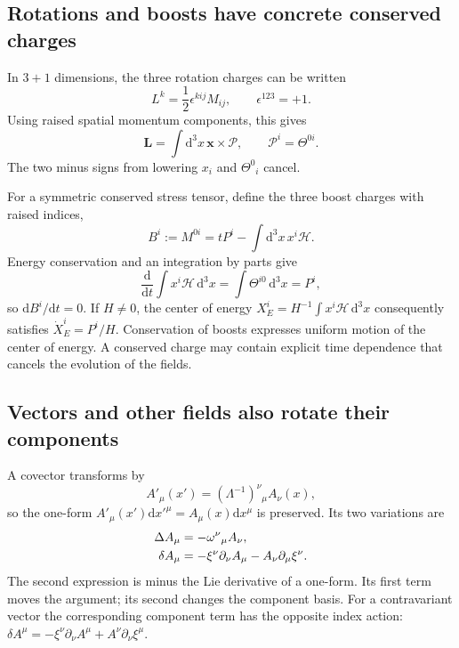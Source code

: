 \documentclass[11pt]{article}
\newcommand{\dd}{\mathrm{d}}
\newcommand{\Th}{\Theta}
\begin{document}
\subsection{Rotations and boosts have concrete conserved charges}
In \(3+1\) dimensions, the three rotation charges can be written
\begin{equation}
L^k=\frac12\epsilon^{kij}M_{ij},\qquad \epsilon^{123}=+1.
\end{equation}
Using raised spatial momentum components, this gives
\begin{equation}
\bm L=\int\dd^3x\,\bm x\times\bm{\mathcal P},
\qquad \mathcal P^i=\Th^{0i}.
\end{equation}
The two minus signs from lowering \(x_i\) and \(\Th^0{}_i\) cancel.

For a symmetric conserved stress tensor, define the three boost charges
with raised indices,
\begin{equation}
B^i:=M^{0i}=tP^i-\int\dd^3x\,x^i\mathcal H.
\label{eq:boost}
\end{equation}
Energy conservation and an integration by parts give
\begin{equation}
\frac{\dd}{\dd t}\int x^i\mathcal H\,\dd^3x
=\int\Th^{i0}\,\dd^3x=P^i,
\end{equation}
so \(\dd B^i/\dd t=0\). If \(H\ne0\), the center of energy
\(X_E^i=H^{-1}\int x^i\mathcal H\,\dd^3x\) consequently satisfies
\(\dot X_E^i=P^i/H\). Conservation of boosts expresses uniform motion of
the center of energy. A conserved charge may contain explicit time
dependence that cancels the evolution of the fields.

\subsection{Vectors and other fields also rotate their components}
A covector transforms by
\begin{equation}
A'_\mu(x')=(\Lambda^{-1})^\nu{}_{\mu}A_\nu(x),
\end{equation}
so the one-form \(A'_\mu(x')\dd x'^\mu=A_\mu(x)\dd x^\mu\) is preserved.
Its two variations are
\begin{align}
\Delta A_\mu&=-\omega^\nu{}_{\mu}A_\nu,\notag\\
\delta A_\mu&=-\xi^\nu\partial_\nu A_\mu
             -A_\nu\partial_\mu\xi^\nu.
\label{eq:covectorVariation}
\end{align}
The second expression is minus the Lie derivative of a one-form. Its
first term moves the argument; its second changes the component basis.
For a contravariant vector the corresponding component term has the
opposite index action:
\(\delta A^\mu=-\xi^\nu\partial_\nu A^\mu
+A^\nu\partial_\nu\xi^\mu\).
\end{document}
